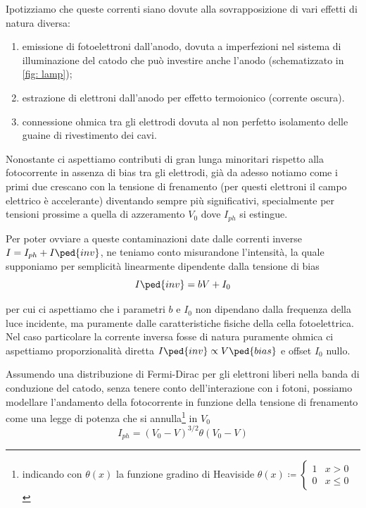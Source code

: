\documentclass[10pt, a4paper, italian]{article}
\begin{document}
Ipotizziamo che queste correnti siano dovute alla sovrapposizione di vari
effetti di natura diversa:
\begin{enumerate}
        \item emissione di fotoelettroni dall'anodo, dovuta a imperfezioni nel
        sistema di illuminazione del catodo che può investire anche l'anodo
        (schematizzato in \cref{fig: lamp});
        \item estrazione di elettroni dall'anodo per effetto termoionico
        (corrente oscura).
        \item connessione ohmica tra gli elettrodi dovuta al non perfetto
        isolamento delle guaine di rivestimento dei cavi.
    \end{enumerate}

Nonostante ci aspettiamo contributi di gran lunga minoritari rispetto alla
fotocorrente in assenza di bias tra gli elettrodi, già da adesso notiamo come
i primi due crescano con la tensione di frenamento (per questi elettroni il
campo elettrico è accelerante) diventando sempre più significativi,
specialmente per tensioni prossime a quella di azzeramento $V_0$ dove
$I_{ph}$ si estingue.

Per poter ovviare a queste contaminazioni date dalle correnti inverse
$I = I_{ph} + I\ped{inv}$, ne teniamo conto misurandone l'intensità, la quale
supponiamo per semplicità linearmente dipendente dalla tensione di bias
\begin{equation}\label{eq: I0fit}
I\ped{inv} = bV + I_0
\end{equation}

per cui ci aspettiamo che i parametri $b$ e $I_0$ non dipendano dalla
frequenza della luce incidente, ma puramente dalle caratteristiche fisiche
della cella fotoelettrica. Nel caso particolare la corrente inversa fosse di
natura puramente ohmica ci aspettiamo proporzionalità diretta
$I\ped{inv} \propto V\ped{bias}$ e offset $I_0$ nullo.

Assumendo una distribuzione di Fermi-Dirac per gli elettroni liberi nella
banda di conduzione del catodo, senza tenere conto dell'interazione con i
fotoni, possiamo modellare l'andamento della fotocorrente in funzione della
tensione di frenamento come una legge di potenza che si annulla\footnote{
indicando con $\theta(x)$ la funzione gradino di Heaviside $\theta(x) \coloneqq
\begin{cases} 1 & x > 0 \\ 0 & x \leq 0 \end{cases}$} in $V_0$
\[
I_{ph} = (V_0 - V)^{3/2} \theta(V_0 - V)
\]
\end{document}
